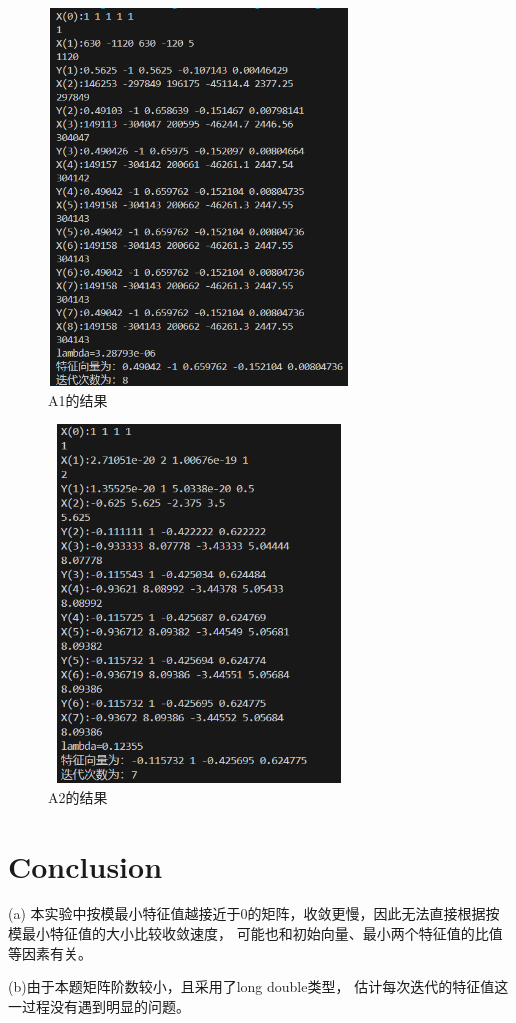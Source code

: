 \documentclass{ctexart}
\begin{document}
\begin{figure}[H]
	\centering 
	\includegraphics[height=10cm,width=8cm]{1.png}
    \caption{A1的结果}
	\end{figure}
	\begin{figure}[H]
		\centering 
		\includegraphics[height=9.5cm,width=8cm]{2.png}
        \caption{A2的结果}
		\end{figure}
		
	\section{Conclusion}
    (a) 本实验中按模最小特征值越接近于0的矩阵，收敛更慢，因此无法直接根据按模最小特征值的大小比较收敛速度，
	可能也和初始向量、最小两个特征值的比值等因素有关。
    
    (b)由于本题矩阵阶数较小，且采用了long double类型， 估计每次迭代的特征值这一过程没有遇到明显的问题。
\end{document}
